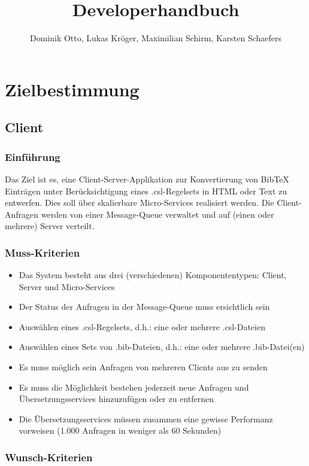 \documentclass[11pt]{article} %
\title{Developerhandbuch}
\author{Dominik Otto, 
Lukas Kröger, 
Maximilian Schirm, 
Karsten Schaefers}
\begin{document}
\maketitle

\section{Zielbestimmung}

\subsection{Client}

\subsubsection{Einführung}
Das Ziel ist es, eine Client-Server-Applikation zur Konvertierung von BibTeX Einträgen unter Berücksichtigung eines .csl-Regelsets in HTML oder Text zu entwerfen.
Dies soll über skalierbare Micro-Services realisiert werden. Die Client-Anfragen werden von einer
Message-Queue verwaltet und auf (einen oder mehrere) Server verteilt.

\subsubsection{Muss-Kriterien}

\begin{itemize}
\item{Das System besteht aus drei (verschiedenen) Komponententypen: Client, Server und Micro-Services}
\item{Der Status der Anfragen in der Message-Queue muss ersichtlich sein}
\item{Auswählen eines .csl-Regelsets, d.h.: eine oder mehrere .csl-Dateien}
\item{Auswählen eines Sets von .bib-Dateien, d.h.: eine oder mehrere .bib-Datei(en)}
\item{Es muss möglich sein Anfragen von mehreren Clients aus zu senden}
\item{Es muss die Möglichkeit bestehen jederzeit neue Anfragen und Übersetzungsservices
hinzuzufügen oder zu entfernen}
\item{Die Übersetzungsservices müssen zusammen eine gewisse Performanz vorweisen (1.000
Anfragen in weniger als 60 Sekunden)}
\end{itemize}

\subsubsection{Wunsch-Kriterien}
\end{document}
